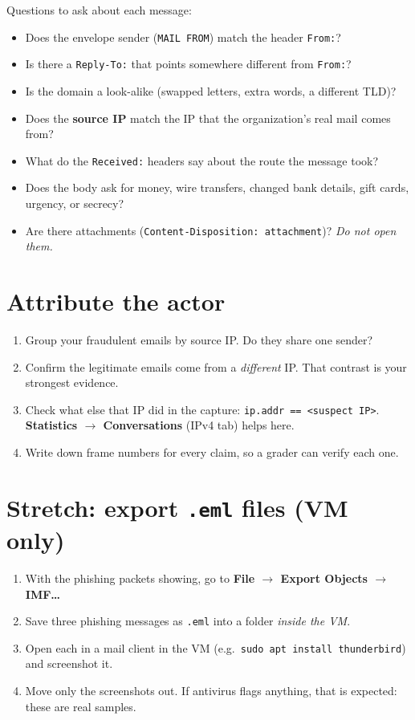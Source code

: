 \documentclass[11pt]{article}
\begin{document}
\noindent Questions to ask about each message:
\begin{itemize}
  \item Does the envelope sender (\texttt{MAIL FROM}) match the header \texttt{From:}?
  \item Is there a \texttt{Reply-To:} that points somewhere different from \texttt{From:}?
  \item Is the domain a look-alike (swapped letters, extra words, a different TLD)?
  \item Does the \textbf{source IP} match the IP that the organization's real mail comes from?
  \item What do the \texttt{Received:} headers say about the route the message took?
  \item Does the body ask for money, wire transfers, changed bank details, gift cards, urgency, or secrecy?
  \item Are there attachments (\texttt{Content-Disposition: attachment})? \emph{Do not open them.}
\end{itemize}

\section{Attribute the actor}
\begin{enumerate}[label=\textbf{5.\arabic*}]
  \item Group your fraudulent emails by source IP. Do they share one sender?
  \item Confirm the legitimate emails come from a \emph{different} IP. That contrast is your strongest evidence.
  \item Check what else that IP did in the capture: \texttt{ip.addr == <suspect IP>}.
        \textbf{Statistics $\rightarrow$ Conversations} (IPv4 tab) helps here.
  \item Write down frame numbers for every claim, so a grader can verify each one.
\end{enumerate}

\section{Stretch: export \texttt{.eml} files (VM only)}
\begin{enumerate}[label=\textbf{6.\arabic*}]
  \item With the phishing packets showing, go to \textbf{File $\rightarrow$ Export Objects $\rightarrow$ IMF\ldots}
  \item Save three phishing messages as \texttt{.eml} into a folder \emph{inside the VM}.
  \item Open each in a mail client in the VM (e.g.\ \texttt{sudo apt install thunderbird}) and screenshot it.
  \item Move only the screenshots out. If antivirus flags anything, that is expected: these are real samples.
\end{enumerate}
\end{document}
